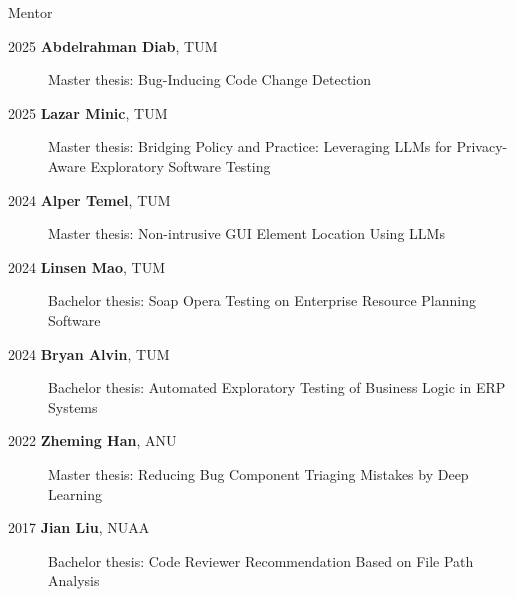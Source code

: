 \documentclass[
	11pt, %
]{resume} %
\begin{document}
\begin{rSection}{Mentor}
    \begin{description}
      \item[2025 \textbf{Abdelrahman Diab}, TUM] Master thesis: Bug-Inducing Code Change Detection
      \item[2025 \textbf{Lazar Minic}, TUM] Master thesis: Bridging Policy and Practice: Leveraging LLMs for Privacy-Aware Exploratory Software Testing
      \item[2024 \textbf{Alper Temel}, TUM] Master thesis: Non-intrusive GUI Element Location Using LLMs
      \item[2024 \textbf{Linsen Mao}, TUM] Bachelor thesis: Soap Opera Testing on Enterprise Resource Planning Software
      \item[2024 \textbf{Bryan Alvin}, TUM] Bachelor thesis: Automated Exploratory Testing of Business Logic in ERP Systems
      \item[2022 \textbf{Zheming Han}, ANU] Master thesis: Reducing Bug Component Triaging Mistakes by Deep Learning
      \item[2017 \textbf{Jian Liu}, NUAA] Bachelor thesis: Code Reviewer Recommendation Based on File Path Analysis
    \end{description}
    
\end{rSection}
\end{document}
